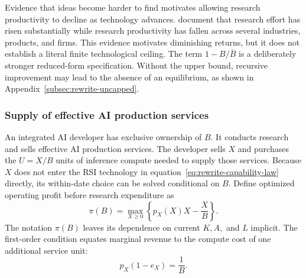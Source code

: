Evidence that ideas become harder to find motivates allowing research
productivity to decline as technology advances. \citet{bloometal2020} document that research effort has risen substantially while research productivity has fallen across several industries, products, and firms. %
This evidence motivates diminishing returns, but it does not establish a literal finite technological ceiling. The term $1-B/\overline B$ is a deliberately stronger reduced-form specification. Without the upper bound, recursive improvement may lead to the absence of an equilibrium, as shown in Appendix~\ref{subsec:rewrite-uncapped}. %

\subsubsection{Supply of effective AI production services}
\label{subsubsec:rewrite-market-structure}

An integrated AI developer has exclusive ownership of $B$. It conducts research
and sells effective AI production services. The developer sells $X$ and purchases the $U=X/B$ units of inference compute needed to supply those services. Because $X$ does not enter the RSI technology in equation~\eqref{eq:rewrite-capability-law}
directly, its within-date choice can be solved conditional on $B$.
Define optimized operating profit before research expenditure as
\begin{equation}
 \pi(B)=\max_{X\geq0}
 \left\{p_X(X)X-\frac{X}{B}\right\}.
 \label{eq:rewrite-service-choice}
\end{equation}
The notation \(\pi(B)\) leaves its dependence on current \(K,A,\) and \(L\) implicit.
The first-order condition equates marginal revenue to the compute cost of one additional service unit:
\begin{equation}
 p_X(1-e_X)=\frac{1}{B}.
 \label{eq:rewrite-monopoly-foc}
\end{equation}

